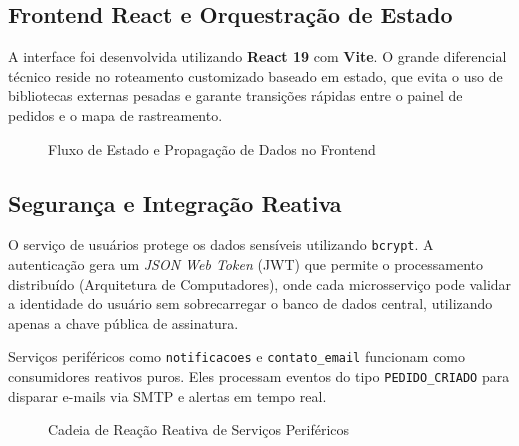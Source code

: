 \documentclass[12pt,a4paper]{article}
\begin{document}
\subsection{Frontend React e Orquestração de Estado}
A interface foi desenvolvida utilizando \textbf{React 19} com \textbf{Vite}. O grande diferencial técnico reside no roteamento customizado baseado em estado, que evita o uso de bibliotecas externas pesadas e garante transições rápidas entre o painel de pedidos e o mapa de rastreamento.

\begin{figure}[h]
    \centering
    \caption{Fluxo de Estado e Propagação de Dados no Frontend}
\end{figure}

\subsection{Segurança e Integração Reativa}
O serviço de usuários protege os dados sensíveis utilizando \texttt{bcrypt}. A autenticação gera um \textit{JSON Web Token} (JWT) que permite o processamento distribuído (Arquitetura de Computadores), onde cada microsserviço pode validar a identidade do usuário sem sobrecarregar o banco de dados central, utilizando apenas a chave pública de assinatura.

Serviços periféricos como \texttt{notificacoes} e \texttt{contato\_email} funcionam como consumidores reativos puros. Eles processam eventos do tipo \texttt{PEDIDO\_CRIADO} para disparar e-mails via SMTP e alertas em tempo real.

\begin{figure}[h]
    \centering
    \caption{Cadeia de Reação Reativa de Serviços Periféricos}
\end{figure}
\end{document}
